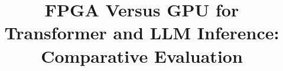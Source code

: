 \documentclass[conference]{IEEEtran}
\begin{document}
\title{FPGA Versus GPU for Transformer and LLM Inference: Comparative Evaluation}
\author{} 
\maketitle
\setcounter{section}{3} %


\end{document}
